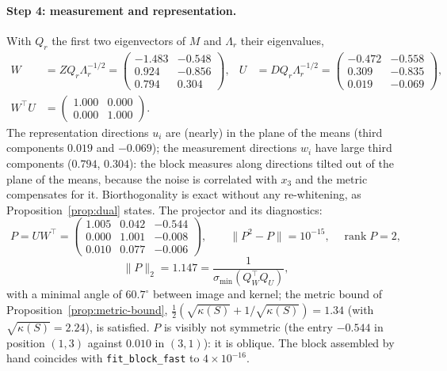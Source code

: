 \documentclass[11pt,a4paper]{article}
\theoremstyle{plain}
\theoremstyle{definition}
\theoremstyle{remark}
\newcommand{\rank}{\operatorname{rank}}
\newcommand{\T}{\top}
\begin{document}
\paragraph{Step 4: measurement and representation.} With
$Q_r$ the first two eigenvectors of $M$ and $\Lambda_r$ their eigenvalues,
\begin{align*}
W&=ZQ_r\Lambda_r^{-1/2}=\begin{pmatrix}-1.483&-0.548\\0.924&-0.856\\0.794&0.304\end{pmatrix},&
U&=DQ_r\Lambda_r^{-1/2}=\begin{pmatrix}-0.472&-0.558\\0.309&-0.835\\0.019&-0.069\end{pmatrix},\\
W^\T U&=\begin{pmatrix}1.000&0.000\\0.000&1.000\end{pmatrix}.
\end{align*}
The representation directions $u_i$ are (nearly) in the plane of the means
(third components $0.019$ and $-0.069$); the measurement directions $w_i$
have large third components ($0.794$, $0.304$): the block measures along
directions tilted out of the plane of the means, because the noise is
correlated with $x_3$ and the metric compensates for it. Biorthogonality is
exact without any re-whitening, as Proposition~\ref{prop:dual} states. The
projector and its diagnostics:
\[
P=UW^\T=\begin{pmatrix}1.005&0.042&-0.544\\0.000&1.001&-0.008\\0.010&0.077&-0.006\end{pmatrix},\qquad
\|P^2-P\|=10^{-15},\quad \rank P=2,
\]
\[
\|P\|_2=1.147=\frac1{\sigma_{\min}(Q_W^\T Q_U)},
\]
with a minimal angle of $60.7^\circ$ between image and kernel; the metric
bound of Proposition~\ref{prop:metric-bound},
$\tfrac12(\sqrt{\kappa(S)}+1/\sqrt{\kappa(S)})=1.34$ (with
$\sqrt{\kappa(S)}=2.24$), is satisfied. $P$ is visibly not symmetric (the entry $-0.544$ in
position $(1,3)$ against $0.010$ in $(3,1)$): it is oblique. The block
assembled by hand coincides with \texttt{fit\_block\_fast} to
$4\times10^{-16}$.
\end{document}
